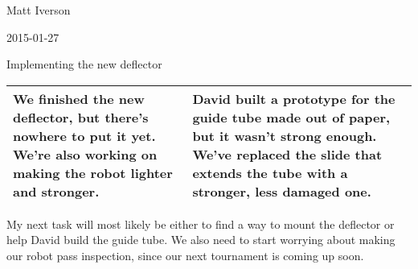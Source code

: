 Matt Iverson

2015-01-27

Implementing the new deflector

\begin{tabular}{|p{5cm}|p{5cm}|}
 \hline
 We finished the new deflector, but there's nowhere to put it yet. We're also working on making the robot lighter and stronger.
&
 David built a prototype for the guide tube made out of paper, but it wasn't strong enough. We've replaced the slide that extends the tube with a stronger, less damaged one.
\\
 \hline
\end{tabular}

My next task will most likely be either to find a way to mount the deflector or help David build the guide tube. We also need to start worrying about making our robot pass inspection, since our next tournament is coming up soon.
